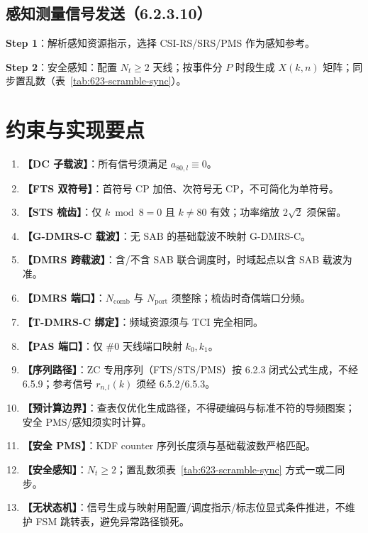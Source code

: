 \documentclass[11pt,a4paper]{ctexart}
\begin{document}
\subsection{感知测量信号发送（6.2.3.10）}

\textbf{Step 1}：解析感知资源指示，选择 CSI-RS/SRS/PMS 作为感知参考。

\textbf{Step 2}：安全感知：配置 $N_t\geq 2$ 天线；按事件分 $P$ 时段生成 $X(k,n)$ 矩阵；同步置乱数（表~\ref{tab:623-scramble-sync}）。

\section{约束与实现要点}

\begin{enumerate}[nosep]
  \item \textbf{【DC 子载波】}：所有信号须满足 $a_{80,l}\equiv 0$。
  \item \textbf{【FTS 双符号】}：首符号 CP 加倍、次符号无 CP，不可简化为单符号。
  \item \textbf{【STS 梳齿】}：仅 $k \bmod 8 = 0$ 且 $k{\neq}80$ 有效；功率缩放 $2\sqrt{2}$ 须保留。
  \item \textbf{【G-DMRS-C 载波】}：无 SAB 的基础载波不映射 G-DMRS-C。
  \item \textbf{【DMRS 跨载波】}：含/不含 SAB 联合调度时，时域起点以含 SAB 载波为准。
  \item \textbf{【DMRS 端口】}：$N_{\mathrm{comb}}$ 与 $N_{\mathrm{port}}$ 须整除；梳齿时奇偶端口分频。
  \item \textbf{【T-DMRS-C 绑定】}：频域资源须与 TCI 完全相同。
  \item \textbf{【PAS 端口】}：仅 \#0 天线端口映射 $k_0,k_1$。
  \item \textbf{【序列路径】}：ZC 专用序列（FTS/STS/PMS）按 6.2.3 闭式公式生成，不经 6.5.9；参考信号 $r_{n,l}(k)$ 须经 6.5.2/6.5.3。
  \item \textbf{【预计算边界】}：查表仅优化生成路径，不得硬编码与标准不符的导频图案；安全 PMS/感知须实时计算。
  \item \textbf{【安全 PMS】}：KDF counter 序列长度须与基础载波数严格匹配。
  \item \textbf{【安全感知】}：$N_t \geq 2$；置乱数须表~\ref{tab:623-scramble-sync} 方式一或二同步。
  \item \textbf{【无状态机】}：信号生成与映射用配置/调度指示/标志位显式条件推进，不维护 FSM 跳转表，避免异常路径锁死。
\end{enumerate}
\end{document}
